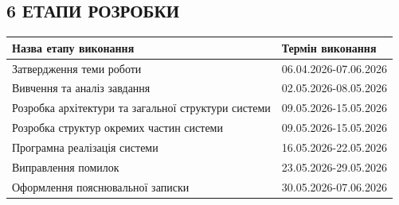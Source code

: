 \begin{unnumbered}
\subsection{6 ЕТАПИ РОЗРОБКИ}

\begin{table}[htbp]
\begin{center}
\begin{tabular}{|p{10cm}|p{5cm}|}
\hline
\textbf{Назва етапу виконання} & \textbf{Термін виконання} \\
\hline
Затвердження теми роботи & 06.04.2026-07.06.2026 \\
\hline
Вивчення та аналіз завдання & 02.05.2026-08.05.2026 \\
\hline
Розробка архітектури та загальної структури системи & 09.05.2026-15.05.2026 \\
\hline
Розробка структур окремих частин системи & 09.05.2026-15.05.2026 \\
\hline
Програмна реалізація системи & 16.05.2026-22.05.2026 \\
\hline
Виправлення помилок & 23.05.2026-29.05.2026 \\
\hline
Оформлення пояснювальної записки & 30.05.2026-07.06.2026 \\
\hline
\end{tabular}
\end{center}
\end{table}

\end{unnumbered}
